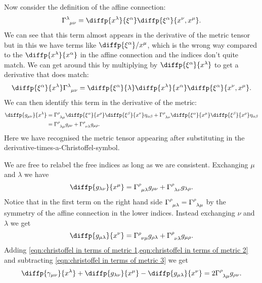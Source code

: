 \documentclass[fleqn]{NotesClass}
\newcommand*{\christoffel}[3]{\tensor{\Gamma}{^{#1}_{{#2}{#3}}}}
\begin{document}
    Now consider the definition of the affine connection:
    \begin{equation}
        \christoffel{\lambda}{\mu}{\nu} = \diffp{x^\lambda}{\xi^\alpha} \diffp{\xi^\alpha}{x^\nu, x^\mu}.
    \end{equation}
    We can see that this term almost appears in the derivative of the metric tensor but in this we have terms like \(\diffp{\xi^\alpha}/{x^\mu}\), which is the wrong way compared to the \(\diffp{x^\lambda}{x^\alpha}\) in the affine connection and the indices don't quite match.
    We can get around this by multiplying by \(\diffp{\xi^\alpha}{x^\lambda}\) to get a derivative that does match:
    \begin{equation}
        \diffp{\xi^\alpha}{x^\lambda} \christoffel{\lambda}{\mu}{\nu} = \diffp{\xi^\alpha}{\lambda} \diffp{x^\lambda}{x^\alpha} \diffp{\xi^\alpha}{x^\nu, x^\mu}.
    \end{equation}
    We can then identify this term in the derivative of the metric:
    \begin{align}
        \diffp{g_{\mu\nu}}{x^\lambda} &= \christoffel{\rho}{\lambda}{\mu} \diffp{\xi^\alpha}{x^\rho} \diffp{\xi^\beta}{x^\nu} \eta_{\alpha\beta} + \christoffel{\rho}{\lambda}{\nu} \diffp{\xi^\alpha}{x^\mu} \diffp{\xi^\beta}{x^\rho} \eta_{\alpha\beta}\\
        &= \christoffel{\rho}{\lambda}{\mu} g_{\rho\nu} + \christoffel{\rho}{\nu}{\lambda} g_{\mu\rho}.\label{eqn:christoffel in terms of metric 1}
    \end{align}
    Here we have recognised the metric tensor appearing after substituting in the derivative-times-a-Christoffel-symbol.
    
    We are free to relabel the free indices as long as we are consistent.
    Exchanging \(\mu\) and \(\lambda\) we have
    \begin{equation}
        \diffp{g_{\lambda\nu}}{x^\mu} = \christoffel{\rho}{\mu}{\lambda} g_{\rho\nu} + \christoffel{\rho}{\lambda}{\nu} g_{\lambda\rho}.\label{eqn:christoffel in terms of metric 2}
    \end{equation}
    Notice that in the first term on the right hand side \(\christoffel{\rho}{\mu}{\lambda} = \christoffel{\rho}{\lambda}{\mu}\) by the symmetry of the affine connection in the lower indices.
    Instead exchanging \(\nu\) and \(\lambda\) we get
    \begin{equation}
        \diffp{g_{\mu\lambda}}{x^\nu} = \christoffel{\rho}{\nu}{\mu} g_{\rho \lambda} + \christoffel{\rho}{\nu}{\lambda} g_{\mu\rho}.\label{eqn:christoffel in terms of metric 3}
    \end{equation}
    Adding \cref{eqn:christoffel in terms of metric 1,eqn:christoffel in terms of metric 2} and subtracting \cref{eqn:christoffel in terms of metric 3} we get
    \begin{equation}
        \diffp{\gamma_{\mu\nu}}{x^\lambda} + \diffp{g_{\lambda\nu}}{x^\mu} - \diffp{g_{\mu\lambda}}{x^\nu} = 2\christoffel{\rho}{\lambda}{\mu}g_{\rho\nu}.
    \end{equation}
    
\end{document}
